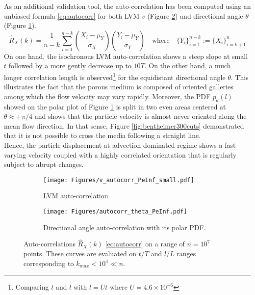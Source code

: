 As an additional validation tool, the auto-correlation has been computed using an unbiased formula \eqref{eq:autocorr} for both LVM $v$ (Figure \ref{fig:autocorrv_peinf}) and directional angle $\theta$ (Figure \ref{fig:autocorrt_peinf}).
\begin{equation}
\hat R_X(k) = \frac{1}{n-k} \sum_{i=1}^{n-k} \left(\frac{X_i-\mu_Y}{\sigma_X}\right)\left(\frac{Y_i-\mu_Y}{\sigma_Y}\right) \quad\textrm{where}\quad \{Y_i\}_{i=1}^{n-k} := \{X_{i}\}_{i=k+1}^{n}
\label{eq:autocorr}
\end{equation}
On one hand, the isochronous LVM auto-correlation shows a steep slope at small $t$ followed by a more gently decrease up to $10T$.
On the other hand, a much longer correlation length is observed\footnote{Comparing $t$ and $l$ with $l=Ut$ where $U = 4.6\times 10^{-6}$} for the equidistant directional angle $\theta$.
This illustrates the fact that the porous medium is composed of oriented galleries among which the flow velocity may vary rapidly.
Moreover, the PDF $p_\theta(l)$ showed on the polar plot of Figure \ref{fig:autocorrt_peinf} is split in two even areas centered at $\theta\approx\pm\pi/4$ and shows that the particle velocity is almost never oriented along the mean flow direction. 
In that sense, Figure \ref{fig:bentheimer300cuts} demonstrated that it is not possible to cross the media following a straight line.\\
Hence, the particle displacement at advection dominated regime shows a fast varying velocity coupled with a highly correlated orientation that is regularly subject to abrupt changes.

\begin{figure}[h!]
	\centering
	\begin{subfigure}[b]{0.25\textwidth}
		\centering
		\texttt{[image: Figures/v\_autocorr\_PeInf\_small.pdf]}
		\caption{LVM auto-correlation}
		\label{fig:autocorrt_peinf}
	\end{subfigure}
	\hfill
	\begin{subfigure}[b]{0.7\textwidth}
		\centering
		\texttt{[image: Figures/autocorr\_theta\_PeInf.pdf]}
		\caption{Directional angle auto-correlation with its polar PDF.}
	\end{subfigure}
	\caption{Auto-correlations $\hat{R}_X(k)$ \eqref{eq:autocorr} on a range of $n=10^7$ points. These curves are evaluated on $t/T$ and $l/L$ ranges corresponding to $k_{max}<10^4 \ll n$.}
	\label{fig:autocorrv_peinf}
\end{figure}

